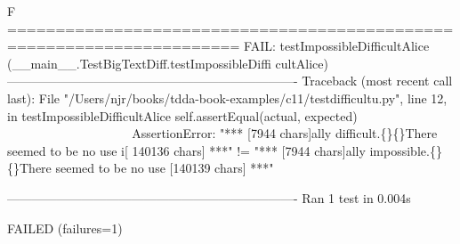 F
======================================================================
FAIL: testImpossibleDifficultAlice (__main__.TestBigTextDiff.testImpossibleDiffi
cultAlice)
----------------------------------------------------------------------
Traceback (most recent call last):
  File "/Users/njr/books/tdda-book-examples/c11/testdifficultu.py", line 12, in 
testImpossibleDifficultAlice
    self.assertEqual(actual, expected)
    ~~~~~~~~~~~~~~~~^^^^^^^^^^^^^^^^^^
AssertionError: "*** [7944 chars]ally difficult.\eol\{\}\eol\{\}There seemed to be no use i[
140136 chars] ***" != "*** [7944 chars]ally impossible.\eol\{\}\eol\{\}There seemed to be no
 use [140139 chars] ***"

----------------------------------------------------------------------
Ran 1 test in 0.004s

FAILED (failures=1)
